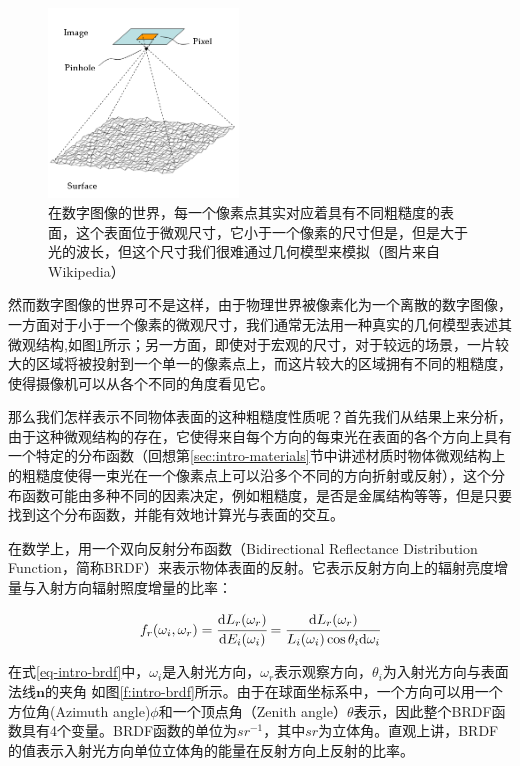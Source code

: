 \begin{figure}
\sidecaption
	\includegraphics[width=0.45\textwidth]{figures/intro/surface-roughness}
	\caption{在数字图像的世界，每一个像素点其实对应着具有不同粗糙度的表面，这个表面位于微观尺寸，它小于一个像素的尺寸但是，但是大于光的波长，但这个尺寸我们很难通过几何模型来模拟（图片来自Wikipedia）}
	\label{f:intro-surface-roughness}
\end{figure}

然而数字图像的世界可不是这样，由于物理世界被像素化为一个离散的数字图像，一方面对于小于一个像素的微观尺寸，我们通常无法用一种真实的几何模型表述其微观结构,如图\ref{f:intro-surface-roughness}所示；另一方面，即使对于宏观的尺寸，对于较远的场景，一片较大的区域将被投射到一个单一的像素点上，而这片较大的区域拥有不同的粗糙度，使得摄像机可以从各个不同的角度看见它。

那么我们怎样表示不同物体表面的这种粗糙度性质呢？首先我们从结果上来分析，由于这种微观结构的存在，它使得来自每个方向的每束光在表面的各个方向上具有一个特定的分布函数（回想第\ref{sec:intro-materials}节中讲述材质时物体微观结构上的粗糙度使得一束光在一个像素点上可以沿多个不同的方向折射或反射），这个分布函数可能由多种不同的因素决定，例如粗糙度，是否是金属结构等等，但是只要找到这个分布函数，并能有效地计算光与表面的交互。

在数学上，用一个双向反射分布函数（Bidirectional Reflectance Distribution Function\cite{a:DirectionalReflectanceandEmissivityofanOpaqueSurface}，简称BRDF）来表示物体表面的反射。它表示反射方向上的辐射亮度增量与入射方向辐射照度增量的比率：

\begin{equation}\label{eq-intro-brdf}
    f_r(\omega_i,\omega_r)= \cfrac{{\rm d}L_r(\omega_r)}{{\rm d}E_i(\omega_i)}= \cfrac{{\rm d}L_r(\omega_r)}{L_i(\omega_i)\cos\theta_i {\rm d}\omega_i}
\end{equation}

\noindent 在式\ref{eq-intro-brdf}中，$\omega_i$是入射光方向，$\omega_r$表示观察方向，$\theta_i$为入射光方向与表面法线$\mathbf{n}$的夹角 如图\ref{f:intro-brdf}所示。由于在球面坐标系中，一个方向可以用一个方位角(Azimuth angle)$\phi$和一个顶点角（Zenith angle）$\theta$表示，因此整个BRDF函数具有4个变量。BRDF函数的单位为$sr^{-1}$，其中$sr$为立体角。直观上讲，BRDF的值表示入射光方向单位立体角的能量在反射方向上反射的比率。

